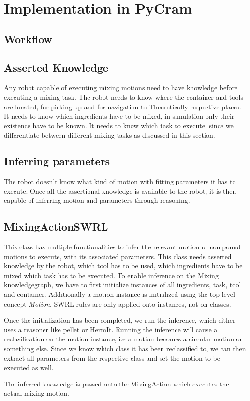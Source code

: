 \section{Implementation in PyCram}

\subsection{Workflow}




\subsection{Asserted Knowledge}
Any robot capable of executing mixing motions need to have knowledge before executing a mixing task. 
The robot needs to know where the container and tools are located, for picking up and for navigation to Theoretically
respective places. It needs to know which ingredients have to be mixed, in simulation only their existence have to be known. 
It needs to know which task to execute, since we differentiate between different mixing tasks as discussed in this section. 


\subsection{Inferring parameters}
The robot doesn't know what kind of motion with fitting parameters it has to execute. Once all the assertional knowledge is available
to the robot, it is then capable of inferring motion and parameters through reasoning. 


\subsection{MixingActionSWRL}
This class has multiple functionalities to infer the relevant motion or compound motions to execute, with its associated 
parameters. This class needs asserted knowledge by the robot, which tool has to be used, which ingredients have to be mixed 
which task has to be executed. To enable inference on the Mixing knowledgegraph, we have to first initialize instances of 
all ingredients, task, tool and container. Additionally a motion instance is initialized using the top-level concept \textit{Motion}. 
SWRL rules are only applied onto instances, not on classes. 

Once the initialization has been completed, we run the inference, which either uses a reasoner like pellet or HermIt. 
Running the inference will cause a reclasification on the motion instance, i.e a motion becomes a circular motion or something else. 
Since we know which class it has been reclassified to, we can then extract all parameters from the respective class and set the motion to be executed as well.

The inferred knowledge is passed onto the MixingAction which executes the actual mixing motion. 






